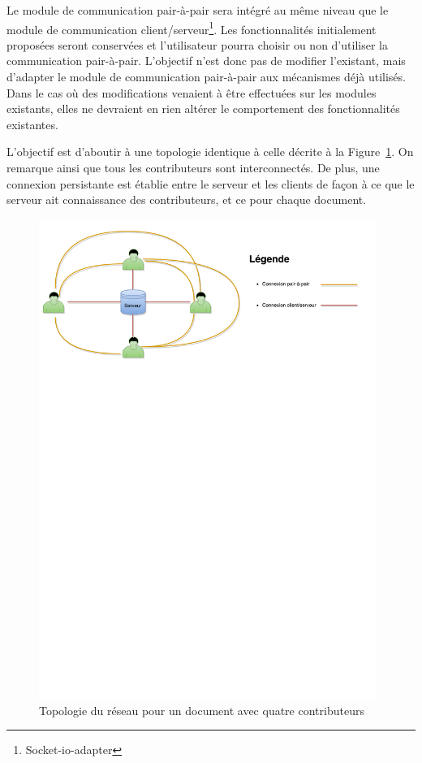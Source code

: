 \documentclass{tnreport}
\begin{document}
Le module de communication pair-à-pair sera intégré au même niveau que le module de communication client/serveur\footnote{Socket-io-adapter}. Les fonctionnalités initialement proposées seront conservées et l'utilisateur pourra choisir ou non d'utiliser la communication pair-à-pair. L'objectif n'est donc pas de modifier l'existant, mais d'adapter le module de communication pair-à-pair aux mécanismes déjà utilisés. Dans le cas où des modifications venaient à être effectuées sur les modules existants, elles ne devraient en rien  altérer le comportement des fonctionnalités existantes.

L'objectif est d'aboutir à une topologie identique à celle décrite à la Figure~\ref{fig:topo-webRTC}. On remarque ainsi que tous les contributeurs sont interconnectés. De plus, une connexion persistante est établie entre le serveur et les clients de façon à ce que le serveur ait connaissance des contributeurs, et ce pour chaque document.

\begin{figure}[!h]
  \centering
  \includegraphics[width=11cm]{figures/topo-webRTC}
  \caption{Topologie du réseau pour un document avec quatre contributeurs}
  \label{fig:topo-webRTC}
\end{figure}
\end{document}
